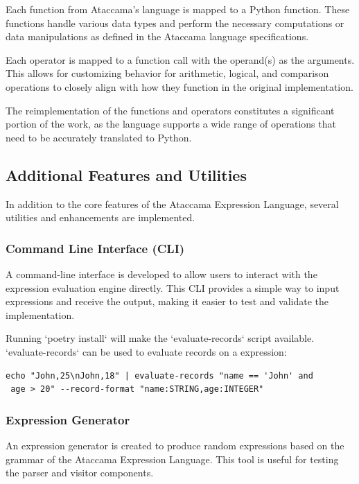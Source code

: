 Each function from Ataccama’s language is mapped to a Python function. These functions handle various data types and perform the necessary computations or data manipulations as defined in the Ataccama language specifications.

Each operator is mapped to a function call with the operand(s) as the arguments. This allows for customizing behavior for arithmetic, logical, and comparison operations to closely align with how they function in the original implementation.

The reimplementation of the functions and operators constitutes a significant portion of the work, as the language supports a wide range of operations that need to be accurately translated to Python.

\subsection{Additional Features and Utilities}

In addition to the core features of the Ataccama Expression Language, several utilities and enhancements are implemented.

\subsubsection{Command Line Interface (CLI)}

A command-line interface is developed to allow users to interact with the expression evaluation engine directly. This CLI provides a simple way to input expressions and receive the output, making it easier to test and validate the implementation.

Running `poetry install` will make the `evaluate-records` script available.
`evaluate-records` can be used to evaluate records on a expression:

\begin{verbatim}
echo "John,25\nJohn,18" | evaluate-records "name == 'John' and
 age > 20" --record-format "name:STRING,age:INTEGER"
\end{verbatim}

\subsubsection{Expression Generator}

An expression generator is created to produce random expressions based on the grammar of the Ataccama Expression Language. This tool is useful for testing the parser and visitor components.

